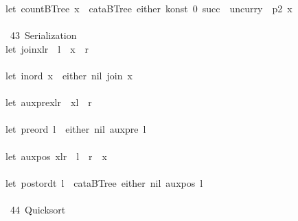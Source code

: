 \documentclass[a4paper]{article}
\begin{document}
\begin{tabbing}
\ttfamily ~let~countBTree~x~~cataBTree~either~konst~0~succ~~uncurry~~p2~x\\
\ttfamily ~\\
\ttfamily ~~43~Serialization~\\
\ttfamily ~let~joinxlr~~l~~x~~r\\
\ttfamily ~\\
\ttfamily ~let~inord~x~~either~nil~join~x\\
\ttfamily ~\\
\ttfamily ~let~auxprexlr~~xl~~r\\
\ttfamily ~\\
\ttfamily ~let~preord~l~~either~nil~auxpre~l\\
\ttfamily ~\\
\ttfamily ~let~auxpos~xlr~~l~~r~~x\\
\ttfamily ~\\
\ttfamily ~let~postordt~l~~cataBTree~either~nil~auxpos~l\\
\ttfamily ~\\
\ttfamily ~~44~Quicksort~\\

\end{tabbing}
\end{document}
